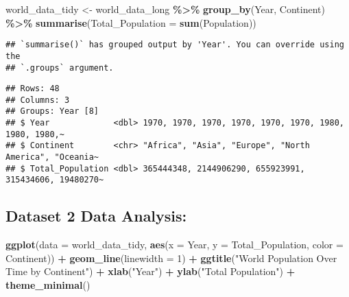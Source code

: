 \documentclass[
]{article}
\newenvironment{Shaded}{\begin{snugshade}}{\end{snugshade}}
\newcommand{\AttributeTok}[1]{\textcolor[rgb]{0.13,0.29,0.53}{#1}}
\newcommand{\DecValTok}[1]{\textcolor[rgb]{0.00,0.00,0.81}{#1}}
\newcommand{\FunctionTok}[1]{\textcolor[rgb]{0.13,0.29,0.53}{\textbf{#1}}}
\newcommand{\NormalTok}[1]{#1}
\newcommand{\OtherTok}[1]{\textcolor[rgb]{0.56,0.35,0.01}{#1}}
\newcommand{\SpecialCharTok}[1]{\textcolor[rgb]{0.81,0.36,0.00}{\textbf{#1}}}
\newcommand{\StringTok}[1]{\textcolor[rgb]{0.31,0.60,0.02}{#1}}
\begin{document}
\begin{Shaded}
\begin{Highlighting}[]
\NormalTok{world\_data\_tidy }\OtherTok{\textless{}{-}}\NormalTok{ world\_data\_long }\SpecialCharTok{\%\textgreater{}\%}
  \FunctionTok{group\_by}\NormalTok{(Year, Continent) }\SpecialCharTok{\%\textgreater{}\%}
  \FunctionTok{summarise}\NormalTok{(}\AttributeTok{Total\_Population =} \FunctionTok{sum}\NormalTok{(Population))}
\end{Highlighting}
\end{Shaded}

\begin{verbatim}
## `summarise()` has grouped output by 'Year'. You can override using the
## `.groups` argument.
\end{verbatim}

\begin{Shaded}
\end{Shaded}

\begin{verbatim}
## Rows: 48
## Columns: 3
## Groups: Year [8]
## $ Year             <dbl> 1970, 1970, 1970, 1970, 1970, 1970, 1980, 1980, 1980,~
## $ Continent        <chr> "Africa", "Asia", "Europe", "North America", "Oceania~
## $ Total_Population <dbl> 365444348, 2144906290, 655923991, 315434606, 19480270~
\end{verbatim}

\subsection{Dataset 2 Data Analysis:}\label{dataset-2-data-analysis}

\begin{Shaded}
\begin{Highlighting}[]
\FunctionTok{ggplot}\NormalTok{(}\AttributeTok{data =}\NormalTok{ world\_data\_tidy, }\FunctionTok{aes}\NormalTok{(}\AttributeTok{x =}\NormalTok{ Year, }\AttributeTok{y =}\NormalTok{ Total\_Population, }\AttributeTok{color =}\NormalTok{ Continent)) }\SpecialCharTok{+}
  \FunctionTok{geom\_line}\NormalTok{(}\AttributeTok{linewidth =} \DecValTok{1}\NormalTok{) }\SpecialCharTok{+}
  \FunctionTok{ggtitle}\NormalTok{(}\StringTok{"World Population Over Time by Continent"}\NormalTok{) }\SpecialCharTok{+}
  \FunctionTok{xlab}\NormalTok{(}\StringTok{"Year"}\NormalTok{) }\SpecialCharTok{+}
  \FunctionTok{ylab}\NormalTok{(}\StringTok{"Total Population"}\NormalTok{) }\SpecialCharTok{+}
  \FunctionTok{theme\_minimal}\NormalTok{()}
\end{Highlighting}
\end{Shaded}
\end{document}
